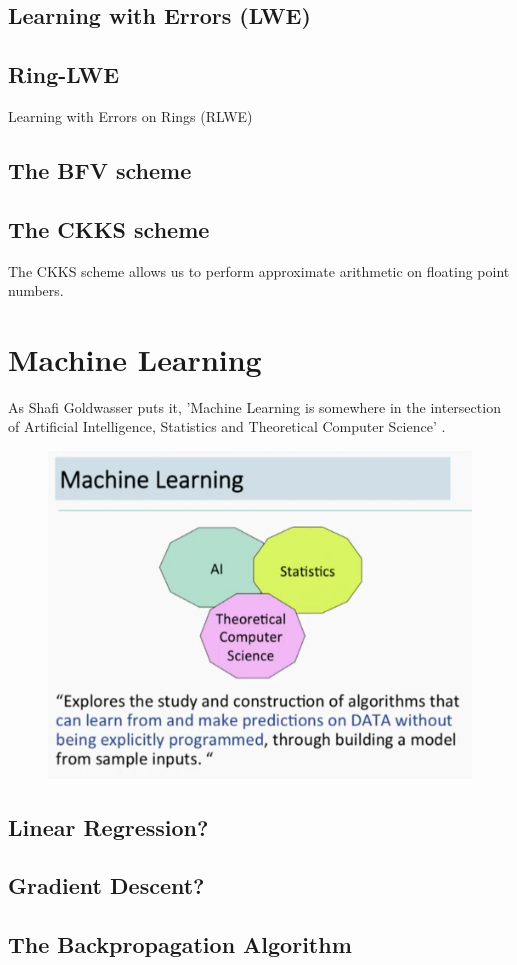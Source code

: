 \subsection{Learning with Errors (LWE)}

\subsection{Ring-LWE}
Learning with Errors on Rings (RLWE)

\subsection{The BFV scheme}
\subsection{The CKKS scheme}
The CKKS scheme allows us to perform approximate arithmetic on floating point numbers.

\section{Machine Learning}
As Shafi Goldwasser puts it, 'Machine Learning is somewhere in the intersection of Artificial Intelligence, Statistics and Theoretical Computer Science' \cite{goldwasserTalk2018}.

\begin{figure}
    \includegraphics[width=0.4\linewidth]{figures/what-is-machine-learning.png}
\end{figure}

\subsection{Linear Regression?}
\subsection{Gradient Descent?}
\subsection{The Backpropagation Algorithm}
